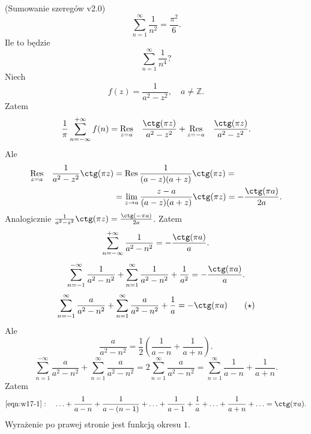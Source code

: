 \documentclass[../main.tex]{subfiles}
\begin{document}
\begin{przyklad}
    (Sumowanie szeregów v2.0)\\
    \[
    \sum_{n=1}^{\infty} \frac{1}{n^2} = \frac{\pi^2}{6}
    .\]
Ile to będzie \[
\sum_{n=1}^{\infty} \frac{1}{n^4}?
\]
    Niech
    \[
        f(z) = \frac{1}{a^2 - z^2},\quad a\neq \mathbb{Z}
    .\]
Zatem
\[
    \frac{1}{\pi}\sum_{n=-\infty}^{+\infty} f(n) = \underset{z = a}{\Res} \quad \frac{\ctg(\pi z)}{a^2 - z^2} + \underset{z = -a}{\Res} \quad \frac{\ctg(\pi z)}{a^2 -z^2}
.\]
Ale
\begin{align*}
    \underset{z = a}{\Res} \quad \frac{1}{a^2 - z^2}\ctg(\pi z) &= \Res \frac{1}{(a-z)(a+z)} \ctg(\pi z) =\\
    &=\lim\limits_{z\to a} \frac{z-a}{(a-z)(a+z)}\ctg(\pi z) = -\frac{\ctg(\pi a)}{2a}
.\end{align*}
Analogicznie $\frac{1}{a^2 - z^2}\ctg(\pi z) = \frac{\ctg(-\pi a)}{2a}$. Zatem
\[
    \sum_{n=-\infty}^{+\infty} \frac{1}{a^2-n^2} = - \frac{\ctg(\pi a)}{a}
.\]
\[
    \sum_{n=-1}^{-\infty} \frac{1}{a^2 - n^2} + \sum_{n=1}^{\infty} \frac{1}{a^2 - n^2} + \frac{1}{a^2} = - \frac{\ctg(\pi a)}{a}
.\]
\begin{equation}
    \label{eqn:w17-1}
    \sum_{n=-1}^{\infty} \frac{a}{a^2 - n^2} + \sum_{n=1}^{\infty} \frac{a}{a^2 - n^2} + \frac{1}{a} = -\ctg(\pi a)\tag{$\star$}
\end{equation}
Ale
\[
    \frac{a}{a^2 - n^2} = \frac{1}{2}\left( \frac{1}{a-n} + \frac{1}{a+n} \right)
.\]
\[
    \sum_{n=1}^{-\infty} \frac{a}{a^2 - n^2} + \sum_{n=1}^{\infty} \frac{a}{a^2 - n^2} = 2 \sum_{n=1}^{\infty} \frac{a}{a^2 - n^2} = \sum_{n=1}^{\infty} \frac{1}{a-n} + \frac{1}{a+n}
.\]
Zatem
\[
    \eqref{eqn:w17-1}:\quad \ldots + \frac{1}{a-n} + \frac{1}{a-(n-1)} + \ldots + \frac{1}{a-1} + \frac{1}{a} + \ldots + \frac{1}{a+n} + \ldots = \ctg(\pi a)
.\]
Wyrażenie po prawej stronie jest funkcją okresu $1$.
\end{przyklad}
\end{document}
